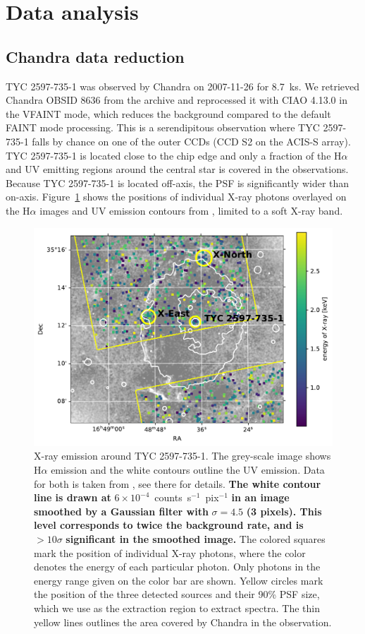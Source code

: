 \documentclass[linenumbers]{aastex631}
\begin{document}
\section{Data analysis} \label{sec:data}
\subsection{Chandra data reduction}
TYC 2597-735-1 was observed by Chandra on 2007-11-26 for 8.7~ks.
We retrieved Chandra OBSID 8636 from  the archive and reprocessed it with CIAO 4.13.0 \citep{2006SPIE.6270E..1VF} in the VFAINT mode, which reduces the background compared to the default FAINT mode processing. This is a serendipitous observation where TYC 2597-735-1 falls by chance on one of the outer CCDs (CCD S2 on the ACIS-S array). TYC 2597-735-1 is located close to the chip edge and only a fraction of the H$\alpha$ and UV emitting regions around the central star is covered in the observations. Because TYC 2597-735-1 is located off-axis, the PSF is significantly wider than on-axis. Figure~\ref{fig:chandraimage} shows the positions of individual X-ray photons overlayed on the H$\alpha$ images and UV emission contours from \citet{2020Natur.587..387H}, limited to a soft X-ray band.
\begin{figure}
    \centering
    \includegraphics[width=\textwidth]{figures/chandraimage.pdf}
\caption{X-ray emission around TYC 2597-735-1. The grey-scale image shows H$\alpha$ emission and the white contours outline the UV emission. Data for both is taken from \citet{2020Natur.587..387H}, see there for details. \textbf{The white contour line is drawn at} $6\times 10^{-4}$~counts~s$^{-1}$~pix$^{-1}$ \textbf{in an image smoothed by a Gaussian filter with} $\sigma=4.5$\arcsec{} \textbf{(3 pixels). This level corresponds to twice the background rate, and is} $>10\sigma$ \textbf{significant in the smoothed image.}
    The colored squares mark the position of individual X-ray photons, where the color denotes the energy of each particular photon. Only photons in the energy range given on the color bar are shown. Yellow circles mark the position of the three detected sources and their 90\% PSF size, which we use as the extraction region to extract spectra. The thin yellow lines outlines the area covered by Chandra in the observation.}
    \label{fig:chandraimage}
\end{figure}
\end{document}

